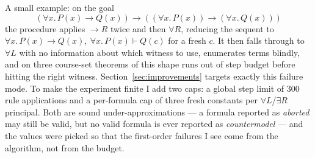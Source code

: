 \documentclass[runningheads]{llncs}
\begin{document}
A small example: on the goal
\[
(\forall x.\,P(x)\to Q(x))\to((\forall x.\,P(x))\to(\forall x.\,Q(x)))
\]
the procedure applies $\to R$ twice and then $\forall R$, reducing the
sequent to $\forall x.\,P(x)\to Q(x),\ \forall x.\,P(x) \vdash Q(c)$
for a fresh $c$. It then falls through to $\forall L$ with no
information about which witness to use, enumerates terms blindly, and
on three course-set theorems of this shape runs out of step budget
before hitting the right witness. Section~\ref{sec:improvements} targets exactly this
failure mode. To make the experiment finite I add two caps: a global
step limit of 300 rule applications and a per-formula cap of three
fresh constants per $\forall L$/$\exists R$ principal. Both are sound
under-approximations --- a formula reported as \emph{aborted} may
still be valid, but no valid formula is ever reported as
\emph{countermodel} --- and the values were picked so that the
first-order failures I see come from the algorithm, not from the
budget.
\end{document}
